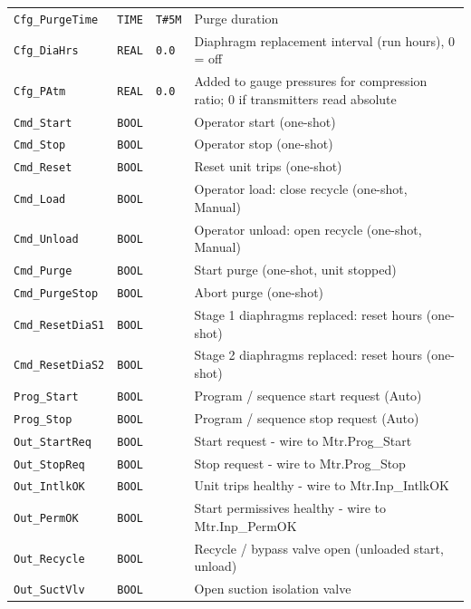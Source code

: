 {\begin{longtable}{@{}>{\raggedright\arraybackslash}p{3.4cm}>{\raggedright\arraybackslash}p{3.3cm}>{\raggedright\arraybackslash}p{1.3cm}>{\raggedright\arraybackslash}p{6.4cm}@{}}
\texttt{Cfg\_PurgeTime} & \texttt{TIME} & \texttt{T\#5M} & Purge duration \\
\texttt{Cfg\_DiaHrs} & \texttt{REAL} & \texttt{0.0} & Diaphragm replacement interval (run hours), 0 = off \\
\texttt{Cfg\_PAtm} & \texttt{REAL} & \texttt{0.0} & Added to gauge pressures for compression ratio; 0 if transmitters read absolute \\
\texttt{Cmd\_Start} & \texttt{BOOL} &  & Operator start (one-shot) \\
\texttt{Cmd\_Stop} & \texttt{BOOL} &  & Operator stop (one-shot) \\
\texttt{Cmd\_Reset} & \texttt{BOOL} &  & Reset unit trips (one-shot) \\
\texttt{Cmd\_Load} & \texttt{BOOL} &  & Operator load: close recycle (one-shot, Manual) \\
\texttt{Cmd\_Unload} & \texttt{BOOL} &  & Operator unload: open recycle (one-shot, Manual) \\
\texttt{Cmd\_Purge} & \texttt{BOOL} &  & Start purge (one-shot, unit stopped) \\
\texttt{Cmd\_PurgeStop} & \texttt{BOOL} &  & Abort purge (one-shot) \\
\texttt{Cmd\_ResetDiaS1} & \texttt{BOOL} &  & Stage 1 diaphragms replaced: reset hours (one-shot) \\
\texttt{Cmd\_ResetDiaS2} & \texttt{BOOL} &  & Stage 2 diaphragms replaced: reset hours (one-shot) \\
\texttt{Prog\_Start} & \texttt{BOOL} &  & Program /\allowbreak{} sequence start request (Auto) \\
\texttt{Prog\_Stop} & \texttt{BOOL} &  & Program /\allowbreak{} sequence stop request (Auto) \\
\texttt{Out\_StartReq} & \texttt{BOOL} &  & Start request - wire to Mtr.Prog\_Start \\
\texttt{Out\_StopReq} & \texttt{BOOL} &  & Stop request - wire to Mtr.Prog\_Stop \\
\texttt{Out\_IntlkOK} & \texttt{BOOL} &  & Unit trips healthy - wire to Mtr.Inp\_IntlkOK \\
\texttt{Out\_PermOK} & \texttt{BOOL} &  & Start permissives healthy - wire to Mtr.Inp\_PermOK \\
\texttt{Out\_Recycle} & \texttt{BOOL} &  & Recycle /\allowbreak{} bypass valve open (unloaded start, unload) \\
\texttt{Out\_SuctVlv} & \texttt{BOOL} &  & Open suction isolation valve \\

\end{longtable}}
